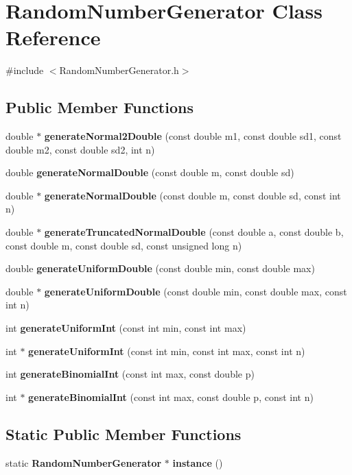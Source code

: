 \section{Random\+Number\+Generator Class Reference}
\label{class_random_number_generator}


{\ttfamily \#include $<$Random\+Number\+Generator.\+h$>$}

\subsection*{Public Member Functions}
\begin{DoxyCompactItemize}
\item 
double $\ast$ \textbf{ generate\+Normal2\+Double} (const double m1, const double sd1, const double m2, const double sd2, int n)
\item 
double \textbf{ generate\+Normal\+Double} (const double m, const double sd)
\item 
double $\ast$ \textbf{ generate\+Normal\+Double} (const double m, const double sd, const int n)
\item 
double $\ast$ \textbf{ generate\+Truncated\+Normal\+Double} (const double a, const double b, const double m, const double sd, const unsigned long n)
\item 
double \textbf{ generate\+Uniform\+Double} (const double min, const double max)
\item 
double $\ast$ \textbf{ generate\+Uniform\+Double} (const double min, const double max, const int n)
\item 
int \textbf{ generate\+Uniform\+Int} (const int min, const int max)
\item 
int $\ast$ \textbf{ generate\+Uniform\+Int} (const int min, const int max, const int n)
\item 
int \textbf{ generate\+Binomial\+Int} (const int max, const double p)
\item 
int $\ast$ \textbf{ generate\+Binomial\+Int} (const int max, const double p, const int n)
\end{DoxyCompactItemize}
\subsection*{Static Public Member Functions}
\begin{DoxyCompactItemize}
\item 
static \textbf{ Random\+Number\+Generator} $\ast$ \textbf{ instance} ()
\end{DoxyCompactItemize}
